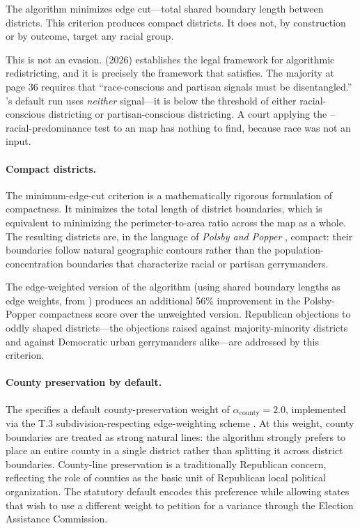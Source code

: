 The algorithm minimizes edge cut---total shared boundary length between
districts.
This criterion produces compact districts.
It does not, by construction or by outcome, target any racial group.

This is not an evasion.
\callais{} (2026) establishes the legal framework for algorithmic
redistricting, and it is precisely the framework that \ar{} satisfies.
The majority at page 36 requires that ``race-conscious and partisan signals
must be disentangled.''
\ar{}'s default run uses \emph{neither} signal---it is below the threshold
of either racial-conscious districting or partisan-conscious districting.
A court applying the \shaw{}--\miller{} racial-predominance test to an
\ar{} map has nothing to find, because race was not an input.

\paragraph{Compact districts.}
The minimum-edge-cut criterion is a mathematically rigorous formulation of
compactness.
It minimizes the total length of district boundaries, which is equivalent
to minimizing the perimeter-to-area ratio across the map as a whole.
The resulting districts are, in the language of \textit{Polsby and Popper}
\citep{polsby1991}, compact: their boundaries follow natural geographic
contours rather than the population-concentration boundaries that
characterize racial or partisan gerrymanders.

The edge-weighted version of the algorithm (using shared boundary lengths
as edge weights, from \citet{b2paper}) produces an additional 56\%
improvement in the Polsby-Popper compactness score over the unweighted
version.
Republican objections to oddly shaped districts---the objections raised
against majority-minority districts and against Democratic urban gerrymanders
alike---are addressed by this criterion.

\paragraph{County preservation by default.}
The \dia{} specifies a default county-preservation weight of $\alpha_\text{county} = 2.0$,
implemented via the T.3 subdivision-respecting edge-weighting scheme
\citep{b10paper}.
At this weight, county boundaries are treated as strong natural lines:
the algorithm strongly prefers to place an entire county in a single
district rather than splitting it across district boundaries.
County-line preservation is a traditionally Republican concern, reflecting
the role of counties as the basic unit of Republican local political
organization.
The statutory default encodes this preference while allowing states that
wish to use a different weight to petition for a variance through the
Election Assistance Commission.


